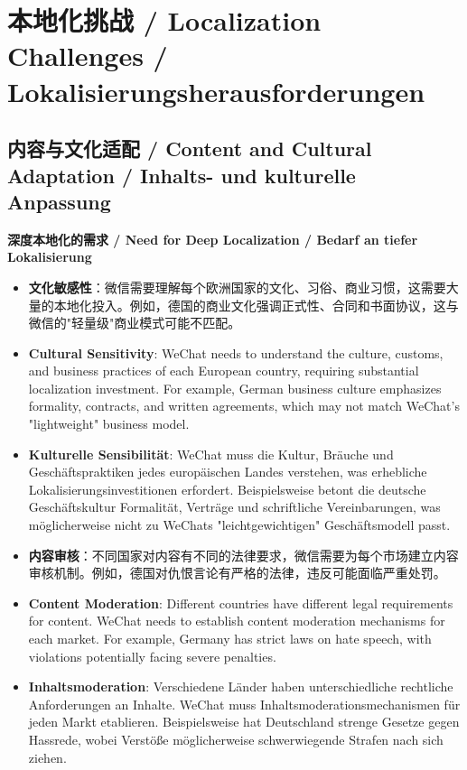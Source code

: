 \documentclass[11pt,a4paper]{article}
\begin{document}
\section{本地化挑战 / Localization Challenges / Lokalisierungsherausforderungen}

\subsection{内容与文化适配 / Content and Cultural Adaptation / Inhalts- und kulturelle Anpassung}

\textbf{深度本地化的需求 / Need for Deep Localization / Bedarf an tiefer Lokalisierung}

\begin{itemize}
    \item \textbf{文化敏感性}：微信需要理解每个欧洲国家的文化、习俗、商业习惯，这需要大量的本地化投入。例如，德国的商业文化强调正式性、合同和书面协议，这与微信的"轻量级"商业模式可能不匹配。
    \item \textbf{Cultural Sensitivity}: WeChat needs to understand the culture, customs, and business practices of each European country, requiring substantial localization investment. For example, German business culture emphasizes formality, contracts, and written agreements, which may not match WeChat's "lightweight" business model.
    \item \textbf{Kulturelle Sensibilität}: WeChat muss die Kultur, Bräuche und Geschäftspraktiken jedes europäischen Landes verstehen, was erhebliche Lokalisierungsinvestitionen erfordert. Beispielsweise betont die deutsche Geschäftskultur Formalität, Verträge und schriftliche Vereinbarungen, was möglicherweise nicht zu WeChats "leichtgewichtigen" Geschäftsmodell passt.
    
    \item \textbf{内容审核}：不同国家对内容有不同的法律要求，微信需要为每个市场建立内容审核机制。例如，德国对仇恨言论有严格的法律，违反可能面临严重处罚。
    \item \textbf{Content Moderation}: Different countries have different legal requirements for content. WeChat needs to establish content moderation mechanisms for each market. For example, Germany has strict laws on hate speech, with violations potentially facing severe penalties.
    \item \textbf{Inhaltsmoderation}: Verschiedene Länder haben unterschiedliche rechtliche Anforderungen an Inhalte. WeChat muss Inhaltsmoderationsmechanismen für jeden Markt etablieren. Beispielsweise hat Deutschland strenge Gesetze gegen Hassrede, wobei Verstöße möglicherweise schwerwiegende Strafen nach sich ziehen.
    

\end{itemize}
\end{document}
